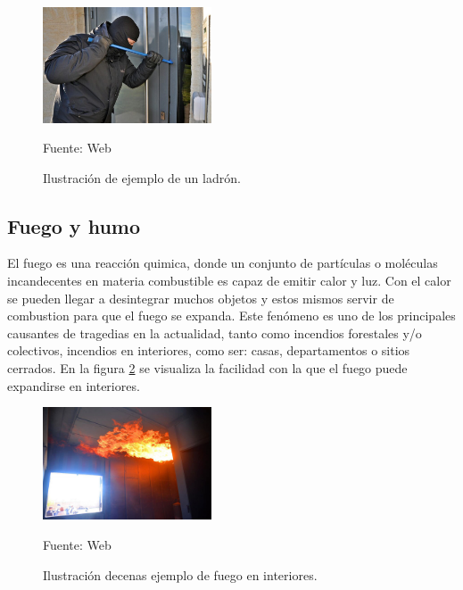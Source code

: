\begin{figure}[H]
    \begin{center}
        \includegraphics[width=5cm]{img/capitulo_3/burglar.jpg}
    \end{center}
    \begin{center}
        \caption{Ilustración de ejemplo de un ladrón.} 
        Fuente: Web
        \label{fig:ladron}
    \end{center}
\end{figure}

\subsection{Fuego y humo}
El fuego es una reacción quimica, donde un conjunto de partículas o moléculas incandecentes en materia combustible es capaz de emitir calor y luz. Con el calor se pueden llegar a desintegrar muchos objetos y estos mismos servir de combustion para que el fuego se expanda.
Este fenómeno es uno de los principales causantes de tragedias en la actualidad, tanto como incendios forestales y/o colectivos, incendios en interiores, como ser: casas, departamentos o sitios cerrados. En la figura \ref{fig:fuego} se visualiza la facilidad con la que el fuego puede expandirse en interiores.\\

\begin{figure}[H]
    \begin{center}
        \includegraphics[width=5cm]{img/capitulo_3/fuego_en_interiores.jpg}
    \end{center}
    \begin{center}
        \caption{Ilustración decenas ejemplo de fuego en interiores.} 
        Fuente: Web 
        \label{fig:fuego}
    \end{center}
\end{figure}

